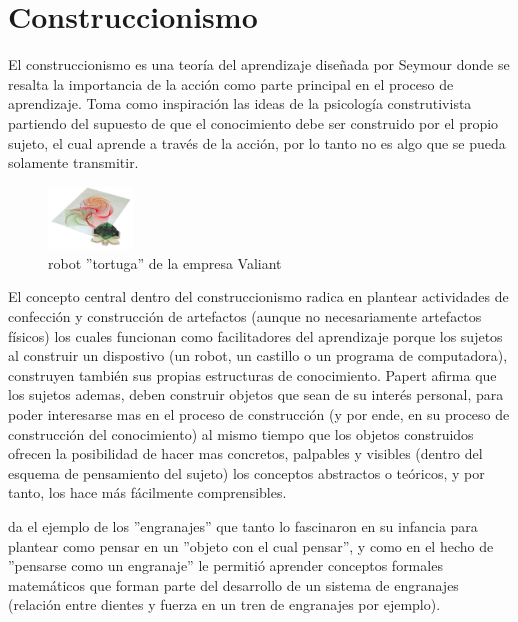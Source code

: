 \section{Construccionismo}

El construccionismo es una teoría del aprendizaje diseñada por Seymour \cite{seymour_papert_desafio_1987} donde se resalta la importancia de la acción como parte principal en el proceso de aprendizaje. Toma como inspiración las ideas de la psicología construtivista partiendo del supuesto de que el conocimiento debe ser construido por el propio sujeto, el cual aprende a través de la acción, por lo tanto no es algo que se pueda solamente transmitir.

\begin{figure}
  \begin{center}
    \includegraphics[width=0.2\textwidth]{figuras/Turtle_draw.jpg}
    \caption[Caption for LOF]{robot ''tortuga'' de la empresa Valiant}
    
    \label{fig:turtle }
  \end{center}
\end{figure}


El concepto central dentro del construccionismo radica en plantear actividades de confección y construcción de artefactos (aunque no necesariamente artefactos físicos) los cuales funcionan como facilitadores del aprendizaje porque los sujetos al construir un dispostivo (un robot, un castillo o un programa de computadora), construyen también sus propias estructuras de conocimiento. Papert afirma que los sujetos ademas, deben construir objetos que sean de su interés personal, para poder interesarse mas en el proceso de construcción (y por ende, en su proceso de construcción del conocimiento) al mismo tiempo que los objetos construidos ofrecen la posibilidad de hacer mas concretos, palpables y visibles (dentro del esquema de pensamiento del sujeto) los conceptos abstractos o teóricos, y por tanto, los hace más fácilmente comprensibles.

\cite{seymour_papert_desafio_1987}  da el ejemplo de los ''engranajes'' que tanto lo fascinaron en su infancia para plantear como pensar en un ''objeto con el cual pensar'', y como en el hecho de ''pensarse como un engranaje'' le permitió aprender conceptos formales matemáticos que forman parte del desarrollo de un sistema de engranajes (relación entre dientes y fuerza en un tren de engranajes por ejemplo).

